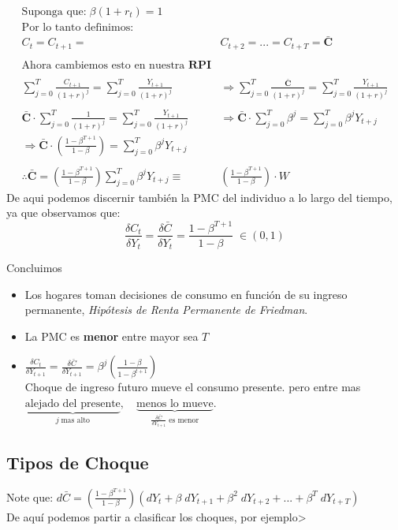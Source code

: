 \documentclass[12pt]{article}
\begin{document}
\begin{align*}
    \text{Suponga que:}\; \beta(1+r_t)=1 \\
    \text{Por lo tanto definimos:} \\
    C_t=C_{t+1}=&C_{t+2}=...=C_{t+T}=\mathbf{\bar{C}}\\\\
    \text{Ahora cambiemos esto en nuestra }\textbf{RPI}\\\\
    \sum^T_{j=0}\frac{C_{t+1}}{(1+r)^j}=\sum^T_{j=0}\frac{Y_{t+1}}{(1+r)^j} & \Rightarrow{} \sum^T_{j=0}\frac{\mathbf{\bar{C}}}{(1+r)^j}=\sum^T_{j=0}\frac{Y_{t+1}}{(1+r)^j} \\\\
    \mathbf{\bar{C}} \cdot \sum^T_{j=0}\frac{1}{(1+r)^j}=\sum^T_{j=0}\frac{Y_{t+1}}{(1+r)^j} & \Rightarrow{} \mathbf{\bar{C}} \cdot \sum^T_{j=0} \beta^j=\sum_{j=0}^T \beta^j Y_{t+j}\\\Rightarrow{} \mathbf{\bar{C}} \cdot (\frac{1-\beta^{T+1}}{1-\beta})=\sum_{j=0}^T \beta^j Y_{t+j} \\\\ 
    \therefore \mathbf{\bar{C}} = (\frac{1-\beta^{T+1}}{1-\beta}) \sum_{j=0}^T \beta^j Y_{t+j}\equiv & (\frac{1-\beta^{T+1}}{1-\beta}) \cdot W
\end{align*}
De aqui podemos discernir también la PMC del individuo a lo largo del tiempo, ya que observamos que: 
$$\frac{\delta C_t}{\delta Y_t}=\frac{\delta \bar{C}}{\delta Y_t}=\frac{1-\beta^{T+1}}{1-\beta}\; \in (0,1)$$
\begin{importante}{Concluimos}
    \begin{itemize}
        \item Los hogares toman decisiones de consumo en función de su ingreso permanente, \textit{Hipótesis de Renta Permanente de Friedman}. 
        \item La PMC es \textbf{menor} entre mayor sea $T$
        \item $\frac{\delta C_t}{\delta Y_{t+1}}=\frac{\delta \bar{C}}{\delta Y_{t+1}}=\beta^j(\frac{1-\beta}{1-\beta^{t+1}})$ \\ 
        Choque de ingreso futuro mueve el consumo presente. pero entre mas $\underbrace{\text{alejado del presente}}_{j\;\text{mas alto}},\quad  \underbrace{\text{menos lo mueve}}_{\frac{\delta \bar{C}}{\delta Y_{t+1}}\;\text{es menor}}.$\\
    \end{itemize}
\end{importante}
\subsection{Tipos de Choque}
Note que: $d\bar{C}=(\frac{1-\beta^{T+1}}{1-\beta})(dY_t+\beta \;dY_{t+1}+\beta ^2 \; dY_{t+2}+...+\beta ^T\; dY_{t+T})$\\
De aquí podemos partir a clasificar los choques, por ejemplo> 
\end{document}
